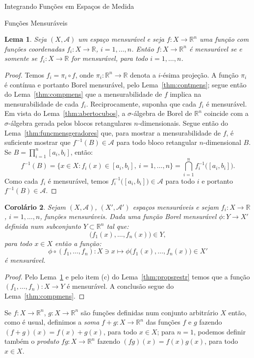 \documentclass[oneside,final,11pt]{amsbook}
\newcommand{\R}{\mathds R}
\theoremstyle{remark}\newtheorem{exercise}{Exercício}[chapter]
\theoremstyle{remark}\newtheorem{*exercise}[exercise]{\hbox to 0pt{\hskip 0pt minus 1fil*}Exercício}
\theoremstyle{definition}\newtheorem{exdefin}{Definição}[chapter]
\theoremstyle{plain}\newtheorem{teo}{Teorema}[section]
\theoremstyle{plain}\newtheorem{lem}[teo]{Lema}
\theoremstyle{plain}\newtheorem{prop}[teo]{Proposição}
\theoremstyle{plain}\newtheorem{cor}[teo]{Corolário}
\theoremstyle{definition}\newtheorem{defin}[teo]{Definição}
\theoremstyle{remark}\newtheorem{rem}[teo]{Observação}
\theoremstyle{definition}\newtheorem{notation}[teo]{Notação}
\theoremstyle{definition}\newtheorem{convention}[teo]{Convenção}
\theoremstyle{definition}\newtheorem{example}[teo]{Exemplo}
\numberwithin{section}{chapter}
\numberwithin{equation}{section}
\begin{document}
\begin{chapter}{Integrando Funções em Espaços de Medida}
\begin{section}{Funções Mensuráveis}
\begin{lem}\label{thm:menscoordbycoord}
Seja $(X,\mathcal A)$ um espaço mensurável e seja $f:X\to\R^n$ uma função com funções coordenadas
$f_i:X\to\R$, $i=1,\ldots,n$. Então $f:X\to\R^n$ é mensurável se e somente se $f_i:X\to\R$ for mensurável,
para todo $i=1,\ldots,n$.
\end{lem}
\begin{proof}
Temos $f_i=\pi_i\circ f$, onde $\pi_i:\R^n\to\R$ denota a $i$-ésima projeção. A função $\pi_i$
é contínua e portanto Borel mensurável, pelo Lema~\ref{thm:contmens}; segue então do Lema~\ref{thm:compmens}
que a mensurabilidade de $f$ implica na mensurabilidade de cada $f_i$.
Reciprocamente, suponha que cada $f_i$ é mensurável. Em vista do Lema~\ref{thm:abertocubos}, a $\sigma$-álgebra de Borel de $\R^n$
coincide com a $\sigma$-álgebra gerada pelos blocos retangulares $n$-dimensionais. Segue então do Lema~\ref{thm:funcmensgeradores}
que, para mostrar a mensurabilidade de $f$, é suficiente mostrar que $f^{-1}(B)\in\mathcal A$ para todo bloco retangular
$n$-dimensional $B$. Se $B=\prod_{i=1}^n[a_i,b_i]$, então:
\[f^{-1}(B)=\big\{x\in X:f_i(x)\in[a_i,b_i],\ i=1,\ldots,n\big\}=\bigcap_{i=1}^nf_i^{-1}\big([a_i,b_i]\big).\]
Como cada $f_i$ é mensurável, temos $f_i^{-1}\big([a_i,b_i]\big)\in\mathcal A$ para todo $i$ e portanto
$f^{-1}(B)\in\mathcal A$.
\end{proof}

\begin{cor}\label{thm:corphidefs}
Sejam $(X,\mathcal A)$, $(X',\mathcal A')$ espaços mensuráveis e sejam $f_i:X\to\R$, $i=1,\ldots,n$,
funções mensuráveis. Dada uma função Borel mensurável
$\phi:Y\to X'$ definida num subconjunto $Y\subset\R^n$ tal que:
\[\big(f_1(x),\ldots,f_n(x)\big)\in Y,\]
para todo $x\in X$ então a função:
\[\phi\circ(f_1,\ldots,f_n):X\ni x\longmapsto\phi\big(f_1(x),\ldots,f_n(x)\big)\in X'\]
é mensurável.
\end{cor}
\begin{proof}
Pelo Lema~\ref{thm:menscoordbycoord} e pelo item (c) do Lema~\ref{thm:propsrestr} temos
que a função $(f_1,\ldots,f_n):X\to Y$ é mensurável. A conclusão segue do Lema~\ref{thm:compmens}.
\end{proof}

Se $f:X\to\R^n$, $g:X\to\R^n$ são funções definidas num conjunto arbitrário $X$ então, como é usual,
definimos a {\em soma\/}
$f+g:X\to\R^n$ das funções $f$ e $g$ fazendo
$(f+g)(x)=f(x)+g(x)$, para todo $x\in X$; para $n=1$, podemos definir também
o {\em produto\/}
$fg:X\to\R^n$ fazendo $(fg)(x)=f(x)g(x)$, para todo $x\in X$.


\end{section}
\end{chapter}
\end{document}
